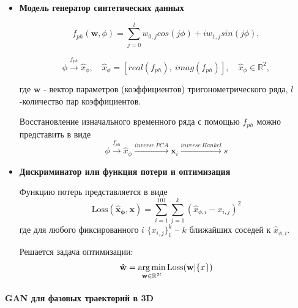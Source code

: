 \documentclass[12pt,twoside]{article}
\begin{document}
\begin{itemize}
\item \textbf{Модель генератор синтетических данных}

\begin{equation}
	f_{ph}(\mathbf{w},\phi) = \sum_{j=0}^{l} w_{0,j}cos(j\phi) + i w_{1,j}sin(j\phi),
\label{eq:f_ph}
\end{equation}

\begin{equation}
	\phi \xrightarrow{f_{ph}} \hat{x}_{\phi},
	\quad
	\hat{x}_{\phi} = [real(f_{ph}),\:imag(f_{ph})],
	\quad
	\hat{x}_{\phi}  \in \mathbb{R}^2,
\label{eq:GAN_fake_1}
\end{equation}
\vspace{\baselineskip}

где $\mathbf{w}$ - вектор параметров (коэффициентов) тригонометрического ряда, $l$-количество пар коэффициентов.

Восстановление изначального временного ряда с помощью $f_{ph}$ можно представить в виде
\begin{equation}
	\phi \xrightarrow{f_{ph}} \hat{x}_{\phi} \xrightarrow{inverse~PCA}  \mathbf{x}_i \xrightarrow{inverse~Hankel}s
\label{eq:GAN_fake_2}
\end{equation}
\end{itemize}

\begin{itemize}
\item \textbf{Дискриминатор или функция потери и оптимизация}

Функцию потерь представляется в виде
\begin{equation}
\textrm{Loss}\mathbf{(\hat{x}_{\phi},x)} =  \sum_{i=1}^{101}\sum_{j=1}^{k}(\hat{x}_{\phi,i} - x_{i,j})^2
\label{eq:L}
\end{equation}
где для любого фиксированного $i$\; $\{x_{i,j}\}_1^k$ -- $k$ ближайших соседей к $\hat{x}_{\phi,i}$.

Решается задача оптимизации:
\begin{equation}
\mathbf{\hat{w}} = \argmin_{\mathbf{w} \in \mathbb{R}^{2l}} \textrm{Loss}(\mathbf{w}|\{x\})
\label{eq:arg_l}
\end{equation}
\end{itemize}

\paragraph{GAN для фазовых траекторий в 3D}
\end{document}
